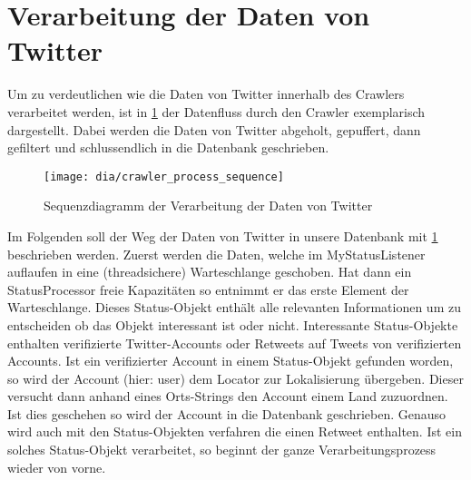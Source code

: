 \section{Verarbeitung der Daten von Twitter}
Um zu verdeutlichen wie die Daten von Twitter innerhalb des Crawlers verarbeitet werden, ist in \cref{fig:crawler_process} der Datenfluss durch den Crawler exemplarisch dargestellt. Dabei werden die Daten von Twitter abgeholt, gepuffert, dann gefiltert und schlussendlich in die Datenbank geschrieben.

\begin{figure}[h!]
	\centering
	\texttt{[image: dia/crawler\_process\_sequence]}
	\caption{Sequenzdiagramm der Verarbeitung der Daten von Twitter}
	\label{fig:crawler_process}
\end{figure}

Im Folgenden soll der Weg der Daten von Twitter in unsere Datenbank mit \cref{fig:crawler_process} beschrieben werden.
Zuerst werden die Daten, welche im MyStatusListener auflaufen in eine (threadsichere) Warteschlange geschoben.
Hat dann ein StatusProcessor freie Kapazitäten so entnimmt er das erste Element der Warteschlange. Dieses Status-Objekt enthält alle relevanten Informationen um zu entscheiden ob das Objekt interessant ist oder nicht.
Interessante Status-Objekte enthalten verifizierte Twitter-Accounts oder Retweets auf Tweets von verifizierten Accounts. Ist ein verifizierter Account in einem Status-Objekt gefunden worden, so wird der Account (hier: user) dem Locator zur Lokalisierung übergeben. Dieser versucht dann anhand eines Orts-Strings den Account einem Land zuzuordnen. Ist dies geschehen so wird der Account in die Datenbank geschrieben. Genauso wird auch mit den Status-Objekten verfahren die einen Retweet enthalten.
Ist ein solches Status-Objekt verarbeitet, so beginnt der ganze Verarbeitungsprozess wieder von vorne.

